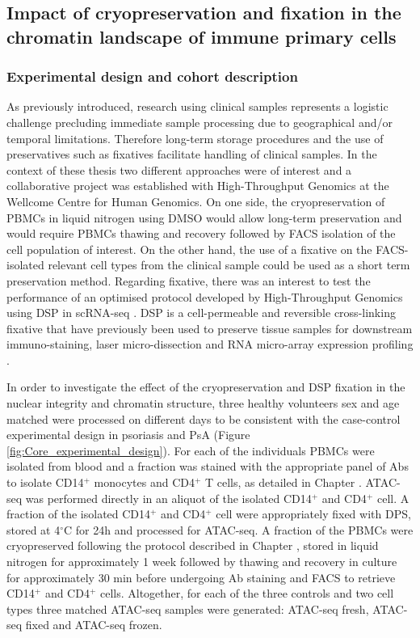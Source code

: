 \subsection{Impact of cryopreservation and fixation in the chromatin landscape of immune primary cells}

\subsubsection{Experimental design and cohort description}
As previously introduced, research using clinical samples represents a logistic challenge precluding immediate sample processing due to geographical and/or temporal limitations. Therefore long-term storage procedures and the use of preservatives such as fixatives facilitate handling of clinical samples. In the context of these thesis two different approaches were of interest and a collaborative project was established with High-Throughput Genomics at the Wellcome Centre for Human Genomics. On one side, the cryopreservation of PBMCs in liquid nitrogen using DMSO would allow long-term preservation and would require PBMCs thawing and recovery followed by FACS isolation of the cell population of interest. On the other hand, the use of a fixative on the FACS-isolated relevant cell types from the clinical sample could be used as a short term preservation method. Regarding fixative, there was an interest to test the performance of an optimised protocol developed by High-Throughput Genomics using DSP in scRNA-seq \parencite{}. DSP is a cell-permeable and reversible cross-linking fixative that have previously been used to preserve tissue samples for downstream immuno-staining, laser micro-dissection and RNA micro-array expression profiling \parencite{}.

In order to investigate the effect of the cryopreservation and DSP fixation in the nuclear integrity and chromatin structure, three healthy volunteers sex and age matched were processed on different days to be consistent with the case-control experimental design in psoriasis and PsA (Figure \ref{fig:Core_experimental_design}). For each of the individuals PBMCs were isolated from blood and a fraction was stained with the appropriate panel of Abs to isolate CD14$^+$ monocytes and CD4$^+$ T cells, as detailed in Chapter \label{ch:Mat}. ATAC-seq was performed directly in an aliquot of the isolated CD14$^+$ and CD4$^+$ cell. A fraction of the isolated CD14$^+$ and CD4$^+$ cell were appropriately fixed with DPS, stored at 4{$^\circ$}C for 24h and processed for ATAC-seq. A fraction of the PBMCs were cryopreserved following the protocol described in Chapter \label{ch:Mat}, stored in liquid nitrogen for approximately 1 week followed by thawing and recovery in culture for approximately 30 min before undergoing Ab staining and FACS to retrieve CD14$^+$ and CD4$^+$ cells. Altogether, for each of the three controls and two cell types three matched ATAC-seq samples were generated: ATAC-seq fresh, ATAC-seq fixed and ATAC-seq frozen.

